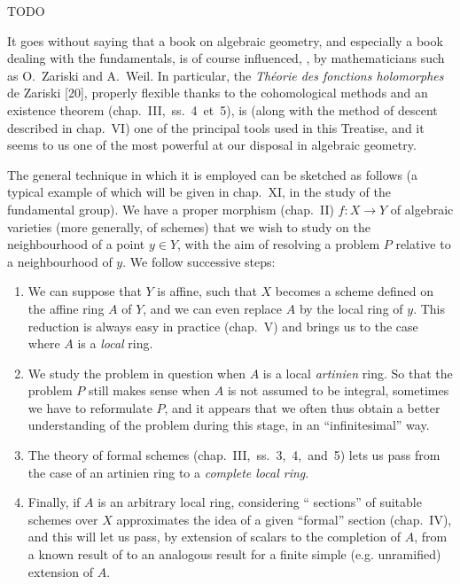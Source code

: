 \documentclass[../main.tex]{subfiles}
\begin{document}
\asttri

TODO

\asttri

It goes without saying that a book on algebraic geometry, and especially a book dealing with the fundamentals, is of course influenced, \completelyunsure, by mathematicians such as O.~Zariski and A.~Weil.
In particular, the \emph{Théorie des fonctions holomorphes} de Zariski [20], properly flexible thanks to the cohomological methods and an existence theorem (chap.~III,~ss.~4~et~5), is (along with the method of descent described in chap.~VI) one of the principal tools used in this Treatise, and it seems to us one of the most powerful at our disposal in algebraic geometry.

The general technique in which it is employed can be sketched as follows (a typical example of which will be given in chap.~XI, in the study of the fundamental group).
We have a proper morphism (chap.~II) $f\colon X\to Y$ of algebraic varieties (more generally, of schemes) that we wish to study on the neighbourhood of a point $y\in Y$, with the aim of resolving a problem $P$ relative to a neighbourhood of $y$.
We follow successive steps:
\begin{enumerate}
    \item We can suppose that $Y$ is affine, such that $X$ becomes a scheme defined on the affine ring $A$ of $Y$, and we can even replace $A$ by the local ring of $y$.
    This reduction is always easy in practice (chap.~V) and brings us to the case where $A$ is a \emph{local} ring.
    \item We study the problem in question when $A$ is a local \emph{artinien} ring.
    So that the problem $P$ still makes sense when $A$ is not assumed to be integral, sometimes we have to reformulate $P$, and it appears that we often thus obtain a better understanding of the problem during this stage, in an ``infinitesimal'' way.
    \item The theory of formal schemes (chap.~III,~ss.~3,~4,~and~5) lets us pass from the case of an artinien ring to a \emph{complete local ring}.
    \item Finally, if $A$ is an arbitrary local ring, considering `` sections'' of suitable schemes over $X$ approximates the idea of a given ``formal'' section (chap.~IV), and this will let us pass, by extension of scalars to the completion of $A$, from a known result of \completelyunsure to an analogous result for a finite simple (e.g. unramified) extension of $A$.
\end{enumerate}
\end{document}
